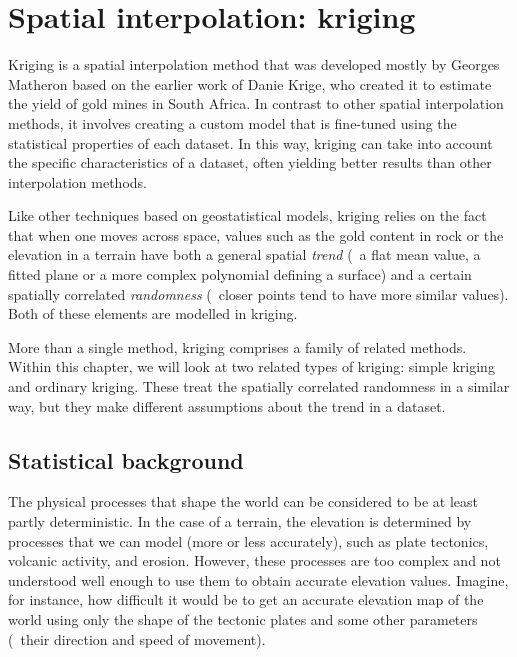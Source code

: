 
\setchapterpreamble[u]{\margintoc}


\graphicspath{{kriging/}}

\chapter{Spatial interpolation: kriging}%
\label{chap:kriging}

Kriging is a spatial interpolation method that was developed mostly by Georges Matheron based on the earlier work of Danie Krige, who created it to estimate the yield of gold mines in South Africa.
In contrast to other spatial interpolation methods, it involves creating a custom model that is fine-tuned using the statistical properties of each dataset.
In this way, kriging can take into account the specific characteristics of a dataset, often yielding better results than other interpolation methods.

Like other techniques based on geostatistical models, kriging relies on the fact that when one moves across space, values such as the gold content in rock or the elevation in a terrain have both a general spatial \emph{trend} (\eg\ a flat mean value, a fitted plane or a more complex polynomial defining a surface) and a certain spatially correlated \emph{randomness} (\ie\ closer points tend to have more similar values).
Both of these elements are modelled in kriging.

More than a single method, kriging comprises a family of related methods.
Within this chapter, we will look at two related types of kriging: simple kriging and ordinary kriging.
These treat the spatially correlated randomness in a similar way, but they make different assumptions about the trend in a dataset.

\section{Statistical background}

The physical processes that shape the world can be considered to be at least partly deterministic.
In the case of a terrain, the elevation is determined by processes that we can model (more or less accurately), such as plate tectonics, volcanic activity, and erosion.
However, these processes are too complex and not understood well enough to use them to obtain accurate elevation values.
Imagine, for instance, how difficult it would be to get an accurate elevation map of the world using only the shape of the tectonic plates and some other parameters (\eg\ their direction and speed of movement).

